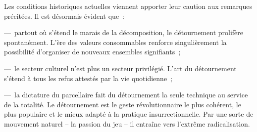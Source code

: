 \documentclass[french,twoside]{book} %
\newcommand{\astermono}{\medskip\centerline{\color{rubric}\large\selectfont{\syms ✻}}\medskip\par}%
\begin{document}
\noindent Les conditions historiques actuelles viennent apporter leur caution aux remarques précitées. Il est désormais évident que :\par
— partout où s’étend le marais de la décomposition, le détournement prolifère spontanément. L’ère des valeurs consommables renforce singulièrement la possibilité d’organiser de nouveaux ensembles signifiants ;\par
— le secteur culturel n’est plus un secteur privilégié. L’art du détournement s’étend à tous les refus attestés par la vie quotidienne ;\par
— la dictature du parcellaire fait du détournement la seule technique au service de la totalité. Le détournement est le geste révolutionnaire le plus cohérent, le plus populaire et le mieux adapté à la pratique insurrectionnelle. Par une sorte de mouvement naturel – la passion du jeu – il entraîne vers l’extrême radicalisation.\par

\astermono
\end{document}
